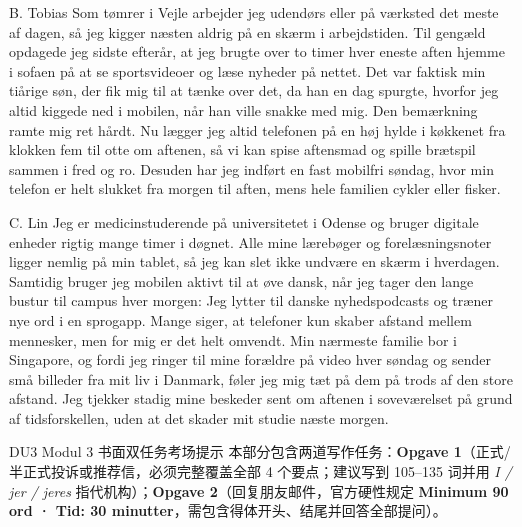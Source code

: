 \begin{emailbox}{B. Tobias}
Som tømrer i Vejle arbejder jeg udendørs eller på værksted det meste af dagen, så jeg kigger næsten aldrig på en skærm i arbejdstiden. Til gengæld opdagede jeg sidste efterår, at jeg brugte over to timer hver eneste aften hjemme i sofaen på at se sportsvideoer og læse nyheder på nettet. Det var faktisk min tiårige søn, der fik mig til at tænke over det, da han en dag spurgte, hvorfor jeg altid kiggede ned i mobilen, når han ville snakke med mig. Den bemærkning ramte mig ret hårdt. Nu lægger jeg altid telefonen på en høj hylde i køkkenet fra klokken fem til otte om aftenen, så vi kan spise aftensmad og spille brætspil sammen i fred og ro. Desuden har jeg indført en fast mobilfri søndag, hvor min telefon er helt slukket fra morgen til aften, mens hele familien cykler eller fisker.
\end{emailbox}

\begin{emailbox}{C. Lin}
Jeg er medicinstuderende på universitetet i Odense og bruger digitale enheder rigtig mange timer i døgnet. Alle mine lærebøger og forelæsningsnoter ligger nemlig på min tablet, så jeg kan slet ikke undvære en skærm i hverdagen. Samtidig bruger jeg mobilen aktivt til at øve dansk, når jeg tager den lange bustur til campus hver morgen: Jeg lytter til danske nyhedspodcasts og træner nye ord i en sprogapp. Mange siger, at telefoner kun skaber afstand mellem mennesker, men for mig er det helt omvendt. Min nærmeste familie bor i Singapore, og fordi jeg ringer til mine forældre på video hver søndag og sender små billeder fra mit liv i Danmark, føler jeg mig tæt på dem på trods af den store afstand. Jeg tjekker stadig mine beskeder sent om aftenen i soveværelset på grund af tidsforskellen, uden at det skader mit studie næste morgen.
\end{emailbox}


\begin{tipbox}{DU3 Modul 3 书面双任务考场提示}
\small
本部分包含两道写作任务：\textbf{Opgave 1}（正式/半正式投诉或推荐信，必须完整覆盖全部 4 个要点；建议写到 105--135 词并用 \textit{I / jer / jeres} 指代机构）；\textbf{Opgave 2}（回复朋友邮件，官方硬性规定 \textbf{Minimum 90 ord · Tid: 30 minutter}，需包含得体开头、结尾并回答全部提问）。
\end{tipbox}

